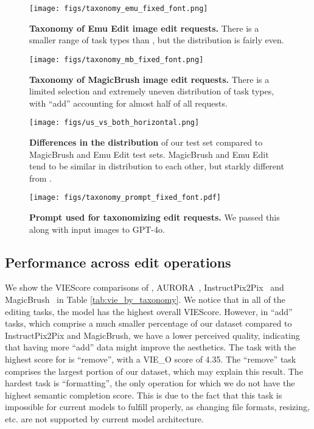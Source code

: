 \begin{figure}[htbp]
    \centering
    \texttt{[image: figs/taxonomy\_emu\_fixed\_font.png]}
    \caption{\textbf{Taxonomy of Emu Edit image edit requests.} There is a smaller range of task types than \ours, but the distribution is fairly even.}
    \label{fig:taxonomy_emu}
\end{figure}

\begin{figure}[htbp]
    \centering
    \texttt{[image: figs/taxonomy\_mb\_fixed\_font.png]}
    \caption{\textbf{Taxonomy of MagicBrush image edit requests.} There is a limited selection and extremely uneven distribution of task types, with ``add'' accounting for almost half of all requests.}
    \label{fig:taxonomy_mb}
\end{figure}

\begin{figure}[!t]
    \centering
    \texttt{[image: figs/us\_vs\_both\_horizontal.png]}
    \caption{\textbf{Differences in the distribution} of our test set compared to MagicBrush and Emu Edit test sets. MagicBrush and Emu Edit tend to be similar in distribution to each other, but starkly different from \RealEdit.}
    \label{fig:dist_us_both_full}
    \vspace{-4mm}
\end{figure}
\begin{figure}[!t]
    \centering
    \texttt{[image: figs/taxonomy\_prompt\_fixed\_font.pdf]}
    \caption{\textbf{Prompt used for taxonomizing edit requests.} We passed this along with input images to GPT-4o.}
    \label{fig:taxonomy_prompt}
\end{figure}
\subsection{Performance across edit operations}
We show the VIEScore comparisons of \ours, AURORA~\cite{krojer2024learning}, InstructPix2Pix~\cite{brooks2023instructpix2pix} and MagicBrush~\cite{zhang2024magicbrush} in Table \ref{tab:vie_by_taxonomy}. We notice that in all of the editing tasks, the \ours model has the highest overall VIEScore. However, in ``add'' tasks, which comprise a much smaller percentage of our dataset compared to InstructPix2Pix and MagicBrush, we have a lower perceived quality, indicating that having more ``add'' data might improve the aesthetics. The task with the highest score for \ours is ``remove'', with a VIE\_O score of 4.35. The ``remove'' task comprises the largest portion of our dataset, which may explain this result. The hardest task is ``formatting'', the only operation for which we do not have the highest semantic completion score. This is due to the fact that this task is impossible for current models to fulfill properly, as changing file formats, resizing, etc. are not supported by current model architecture. 


